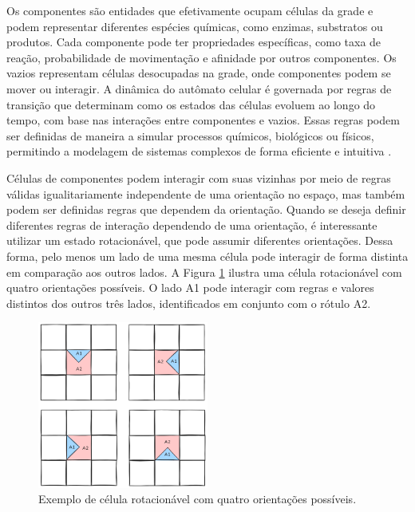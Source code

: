 \documentclass[12pt,oneside]{report}
\begin{document}
Os componentes são entidades que efetivamente ocupam células da grade e podem representar diferentes espécies químicas, como enzimas, substratos ou produtos. Cada componente pode ter propriedades específicas, como taxa de reação, probabilidade de movimentação e afinidade por outros componentes. Os vazios representam células desocupadas na grade, onde componentes podem se mover ou interagir. A dinâmica do autômato celular é governada por regras de transição que determinam como os estados das células evoluem ao longo do tempo, com base nas interações entre componentes e vazios. Essas regras podem ser definidas de maneira a simular processos químicos, biológicos ou físicos, permitindo a modelagem de sistemas complexos de forma eficiente e intuitiva \cite{kier2005}.

Células de componentes podem interagir com suas vizinhas por meio de regras válidas igualitariamente independente de uma orientação no espaço, mas também podem ser definidas regras que dependem da orientação. Quando se deseja definir diferentes regras de interação dependendo de uma orientação, é interessante utilizar um estado rotacionável, que pode assumir diferentes orientações. Dessa forma, pelo menos um lado de uma mesma célula pode interagir de forma distinta em comparação aos outros lados. A Figura \ref{fig:celula_rotacionavel} ilustra uma célula rotacionável com quatro orientações possíveis. O lado A1 pode interagir com regras e valores distintos dos outros três lados, identificados em conjunto com o rótulo A2.

\begin{figure}[H]
    \centering
    \includegraphics[width=0.5\textwidth]{img/componente_rotaciona.png}
    \caption{\small Exemplo de célula rotacionável com quatro orientações possíveis.}
    \label{fig:celula_rotacionavel}
\end{figure}
\end{document}
